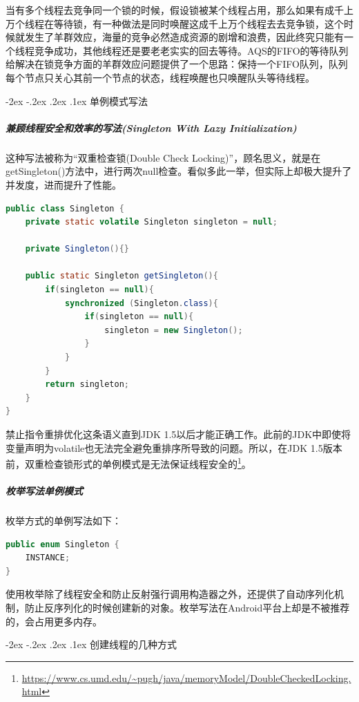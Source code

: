 \documentclass[8pt]{book}
\makeatletter
\numberwithin{dummy}{section}
\theoremstyle{ocrenumbox}
\theoremstyle{blacknumex}
\theoremstyle{blacknumbox}
\theoremstyle{ocrenum}
\renewcommand\paragraph{\@startsection{paragraph}{4}{\z@}
	{-2ex \@plus-.2ex \@minus .2ex}
	{.1ex}
	{\normalfont\small\sffamily\bfseries}}
\makeatother
\begin{document}
当有多个线程去竞争同一个锁的时候，假设锁被某个线程占用，那么如果有成千上万个线程在等待锁，有一种做法是同时唤醒这成千上万个线程去去竞争锁，这个时候就发生了羊群效应，海量的竞争必然造成资源的剧增和浪费，因此终究只能有一个线程竞争成功，其他线程还是要老老实实的回去等待。AQS的FIFO的等待队列给解决在锁竞争方面的羊群效应问题提供了一个思路：保持一个FIFO队列，队列每个节点只关心其前一个节点的状态，线程唤醒也只唤醒队头等待线程。

\paragraph{单例模式写法}

\subparagraph{兼顾线程安全和效率的写法(Singleton With Lazy Initialization)}

这种写法被称为“双重检查锁(Double Check Locking)”，顾名思义，就是在getSingleton()方法中，进行两次null检查。看似多此一举，但实际上却极大提升了并发度，进而提升了性能。

\begin{lstlisting}[language=Java]
public class Singleton {
    private static volatile Singleton singleton = null;
 
    private Singleton(){}
 
    public static Singleton getSingleton(){
        if(singleton == null){
            synchronized (Singleton.class){
                if(singleton == null){
                    singleton = new Singleton();
                }
            }
        }
        return singleton;
    }    
}
\end{lstlisting}

禁止指令重排优化这条语义直到JDK 1.5以后才能正确工作。此前的JDK中即使将变量声明为volatile也无法完全避免重排序所导致的问题。所以，在JDK 1.5版本前，双重检查锁形式的单例模式是无法保证线程安全的\footnote{\url{https://www.cs.umd.edu/~pugh/java/memoryModel/DoubleCheckedLocking.html}}。

\subparagraph{枚举写法单例模式}

枚举方式的单例写法如下：

\begin{lstlisting}[language=Java]
public enum Singleton {
    INSTANCE;
}
\end{lstlisting}

使用枚举除了线程安全和防止反射强行调用构造器之外，还提供了自动序列化机制，防止反序列化的时候创建新的对象。枚举写法在Android平台上却是不被推荐的，会占用更多内存。

\paragraph{创建线程的几种方式}
\end{document}
